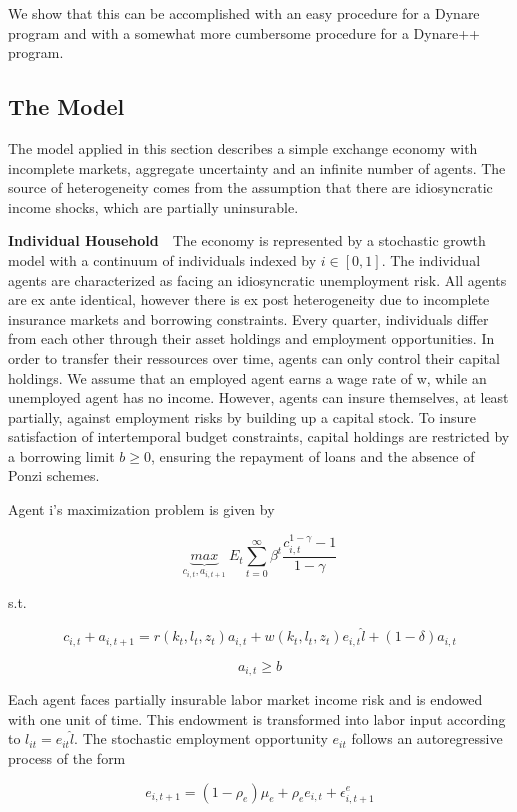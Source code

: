 \documentclass[10pt,math=newtx,citestyle=gb7714-2015,bibstyle=gb7714-2015]{elegantbook}
\begin{document}
{	We show that this can be accomplished with an easy procedure for a Dynare program and with a somewhat more cumbersome procedure for a Dynare++ program.
	
	\subsection{The Model}
	
	The model applied in this section describes a simple exchange economy with incomplete markets, aggregate uncertainty and an infinite number of agents. The source of heterogeneity comes from the assumption that there are idiosyncratic income shocks, which are partially uninsurable.
	
	\textbf{Individual Household}~~The economy is represented by a stochastic growth model with a continuum of individuals indexed by $i\in [0,1]$. The individual agents are characterized as facing an idiosyncratic unemployment risk. All agents are ex ante identical, however there is ex post heterogeneity due to incomplete insurance markets and borrowing constraints. Every quarter, individuals differ from each other through their asset holdings and employment opportunities. In order to transfer their ressources over time, agents can only control their capital holdings. We assume that an employed agent earns a wage rate of w, while an unemployed agent has no income. However, agents can insure themselves, at least partially,
	against employment risks by building up a capital stock. To insure satisfaction of intertemporal budget constraints, capital holdings are restricted by a borrowing limit $b \ge 0$, ensuring the repayment of loans and the absence of Ponzi schemes.
	
	Agent i’s maximization problem is given by
	
	$$\underbrace{max}_{c_{i,t},a_{i,t+1}}~E_t\sum_{t=0}^{\infty}\beta^{t}\frac{c_{i,t}^{1-\gamma}-1}{1-\gamma}$$
	
	s.t.
	
	$$c_{i,t}+a_{i,t+1}=r(k_t,l_t,z_t)a_{i,t}+w(k_t,l_t,z_t)e_{i,t}\hat{l}+(1-\delta)a_{i,t}$$
	
	$$a_{i,t}\ge b$$
	
	Each agent faces partially insurable labor market income risk and is endowed with one unit of time. This endowment is transformed into labor input according to $l_{it} = e_{it}\hat{l}$. The stochastic employment opportunity $e_{it}$ follows an autoregressive process of the form
	
	$$e_{i,t+1}=(1-\rho_e)\mu_e+\rho_ee_{i,t}+\epsilon_{i,t+1}^e$$
	
}
\end{document}
